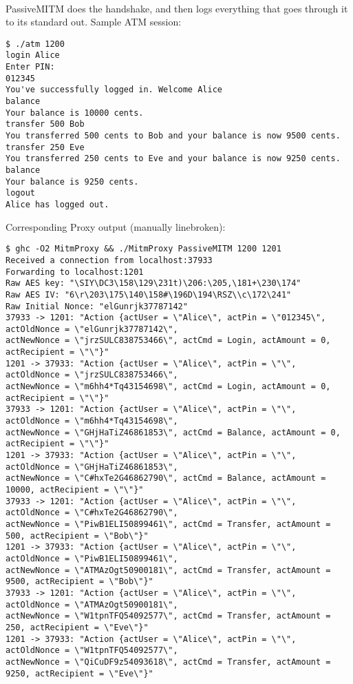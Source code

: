 \documentclass[12pt]{article}
\begin{document}
\\
PassiveMITM does the handshake, and then logs everything that goes through it to its standard out.
Sample ATM session:
\begin{Verbatim}[frame=single,fontsize=\scriptsize]
$ ./atm 1200
login Alice
Enter PIN:
012345
You've successfully logged in. Welcome Alice
balance
Your balance is 10000 cents.
transfer 500 Bob
You transferred 500 cents to Bob and your balance is now 9500 cents.
transfer 250 Eve
You transferred 250 cents to Eve and your balance is now 9250 cents.
balance
Your balance is 9250 cents.
logout
Alice has logged out.
\end{Verbatim}
Corresponding Proxy output (manually linebroken):
\begin{Verbatim}[frame=single,fontsize=\scriptsize]
$ ghc -O2 MitmProxy && ./MitmProxy PassiveMITM 1200 1201
Received a connection from localhost:37933
Forwarding to localhost:1201
Raw AES key: "\SIY\DC3\158\129\231t)\206:\205,\181+\230\174"
Raw AES IV: "6\r\203\175\140\158#\196D\194\RSZ\\c\172\241"
Raw Initial Nonce: "elGunrjk37787142"
37933 -> 1201: "Action {actUser = \"Alice\", actPin = \"012345\", actOldNonce = \"elGunrjk37787142\", 
actNewNonce = \"jrzSULC838753466\", actCmd = Login, actAmount = 0, actRecipient = \"\"}"
1201 -> 37933: "Action {actUser = \"Alice\", actPin = \"\", actOldNonce = \"jrzSULC838753466\", 
actNewNonce = \"m6hh4*Tq43154698\", actCmd = Login, actAmount = 0, actRecipient = \"\"}"
37933 -> 1201: "Action {actUser = \"Alice\", actPin = \"\", actOldNonce = \"m6hh4*Tq43154698\", 
actNewNonce = \"GHjHaTiZ46861853\", actCmd = Balance, actAmount = 0, actRecipient = \"\"}"
1201 -> 37933: "Action {actUser = \"Alice\", actPin = \"\", actOldNonce = \"GHjHaTiZ46861853\", 
actNewNonce = \"C#hxTe2G46862790\", actCmd = Balance, actAmount = 10000, actRecipient = \"\"}"
37933 -> 1201: "Action {actUser = \"Alice\", actPin = \"\", actOldNonce = \"C#hxTe2G46862790\", 
actNewNonce = \"PiwB1ELI50899461\", actCmd = Transfer, actAmount = 500, actRecipient = \"Bob\"}"
1201 -> 37933: "Action {actUser = \"Alice\", actPin = \"\", actOldNonce = \"PiwB1ELI50899461\", 
actNewNonce = \"ATMAzOgt50900181\", actCmd = Transfer, actAmount = 9500, actRecipient = \"Bob\"}"
37933 -> 1201: "Action {actUser = \"Alice\", actPin = \"\", actOldNonce = \"ATMAzOgt50900181\", 
actNewNonce = \"W1tpnTFQ54092577\", actCmd = Transfer, actAmount = 250, actRecipient = \"Eve\"}"
1201 -> 37933: "Action {actUser = \"Alice\", actPin = \"\", actOldNonce = \"W1tpnTFQ54092577\", 
actNewNonce = \"QiCuDF9z54093618\", actCmd = Transfer, actAmount = 9250, actRecipient = \"Eve\"}"

\end{Verbatim}
\end{document}
